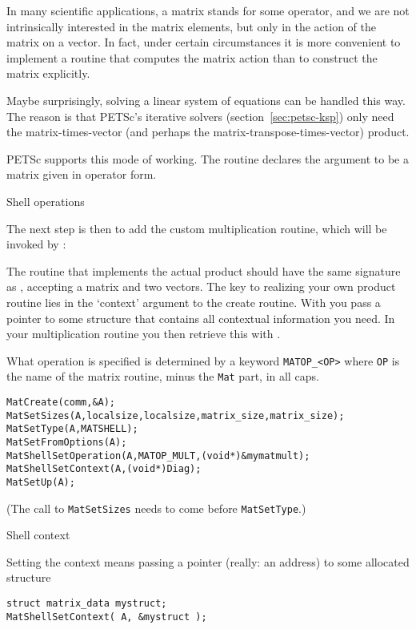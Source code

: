 In many scientific applications, a matrix stands for some operator,
and we are not intrinsically interested in the matrix elements, but
only in the action of the matrix on a vector. In fact, under certain
circumstances it is more convenient to implement a routine that
computes the matrix action than to construct the matrix explicitly.

Maybe surprisingly, solving a linear system of equations can be
handled this way. The reason is that PETSc's iterative solvers
(section~\ref{sec:petsc-ksp}) only need the matrix-times-vector (and perhaps
the matrix-transpose-times-vector) product.

PETSc supports this mode of working. The routine 
declares the argument to be a matrix given in operator form.

 {Shell operations}

The next step is then to add the custom multiplication routine, which
will be invoked by :
%

The routine that implements the actual product should have the same
signature as , accepting a matrix and two
vectors. The key to realizing your own product routine lies in the
`context' argument to the create routine. With
 you pass a pointer to some
structure that contains all contextual information you need. In your
multiplication routine you then retrieve this with .

What operation is specified is determined by a keyword \lstinline+MATOP_<OP>+
where \lstinline{OP} is the name of the matrix routine, minus the \lstinline{Mat} part,
in all caps.

\begin{lstlisting}
MatCreate(comm,&A);
MatSetSizes(A,localsize,localsize,matrix_size,matrix_size);
MatSetType(A,MATSHELL);
MatSetFromOptions(A);
MatShellSetOperation(A,MATOP_MULT,(void*)&mymatmult);
MatShellSetContext(A,(void*)Diag);
MatSetUp(A);
\end{lstlisting}
(The call to \lstinline{MatSetSizes} needs to come before \lstinline{MatSetType}.)

 {Shell context}

Setting the context means passing a pointer (really: an address) to
some allocated structure
\begin{lstlisting}
struct matrix_data mystruct;
MatShellSetContext( A, &mystruct );
\end{lstlisting}

